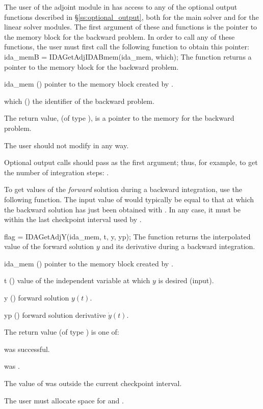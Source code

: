 The user of the adjoint module in {\idas} has access to any of the
optional output functions described in \S\ref{ss:optional_output},
both for the main solver and for the linear solver modules. The first
argument of these  and  functions is the
pointer to the {\idas} memory block for the backward problem. In order
to call any of these functions, the user must first call the following
function to obtain this pointer:
{
  ida\_memB = IDAGetAdjIDABmem(ida\_mem, which);
}
{
  The function  returns a pointer to the {\idas}
  memory block for the backward problem.
}
{
  \begin{args}
  \item[ida\_mem] ()
    pointer to the {\idas} memory block created by .
  \item[which] ()
    the identifier of the backward problem.
  \end{args}
}
{
  The return value,  (of type ), is a pointer to the
  {\idas} memory for the backward problem.
}
{
  {\warn}The user should not modify  in any way.

  Optional output calls should pass  as the first argument;
  thus, for example, to get the number of integration steps:
  .
}


To get values of the {\it forward} solution during a backward integration,
use the following function.  The input value of  would typically be
equal to that at which the backward solution has just been obtained with
.  In any case, it must be within the last checkpoint interval
used by .

{
  flag = IDAGetAdjY(ida\_mem, t, y, yp);
}
{
  The function  returns the interpolated value of the
 forward solution $y$ and its derivative during a backward integration.
}
{
  \begin{args}
  \item[ida\_mem] ()
    pointer to the {\idas} memory block created by .
  \item[t] ()
    value of the independent variable at which $y$ is desired (input).
  \item[y] () forward solution $y(t)$.
  \item[yp] () forward solution derivative $\dot{y}(t)$.
  \end{args}
}
{
  The return value  (of type ) is one of:
 \begin{args}
  \item[\Id{IDA\_SUCCESS}]
     was successful.
  \item[\Id{IDA\_MEM\_NULL}]
     was .
  \item[\Id{IDA\_GETY\_BADT}]
    The value of  was outside the current checkpoint interval.
  \end{args}
}
{
  {\warn} The user must allocate space for  and .
}

